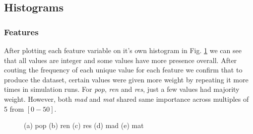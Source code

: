 \documentclass[12pt,letterpaper]{article}
\begin{document}
\subsection{Histograms}
\subsubsection{Features}
After plotting each feature variable on it's own histogram in Fig. \ref{fig:feat_histograms}
we can see that all values are integer and some values have more presence overall.
After couting the frequency of each unique value for each feature we confirm that to 
produce the dataset, certain values were given more weight by repeating it more times
in simulation runs. For \emph{pop}, \emph{ren} and \emph{res}, just a few values had
majority weight. However, both \emph{mad} and \emph{mat} shared same importance across
multiples of 5 from $[0-50]$.
\begin{figure}[h]
    \centering
    \hfil
    \caption{(a) pop (b) ren (c) res (d) mad (e) mat}
    \label{fig:feat_histograms}
\end{figure}
\end{document}
